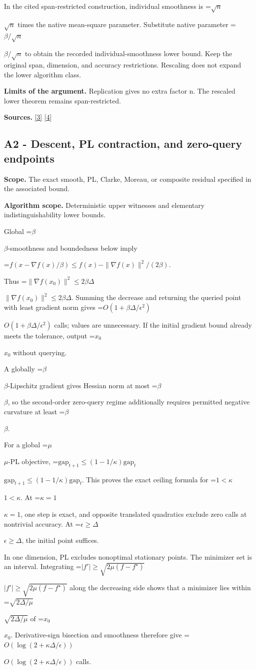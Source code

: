 \documentclass[10pt,a4paper]{article}
\newcommand{\AtlasMath}[1]{\par\begingroup\centering\setbox0=\hbox{$\displaystyle #1$}\ifdim\wd0>1.4\linewidth\typeout{ATLAS WIDE FORMULA: \the\wd0}\fi\ifdim\wd0>\linewidth\resizebox{\linewidth}{!}{\box0}\else\box0\fi\par\endgroup}
\newcommand{\AtlasInlineMath}[1]{\begingroup\setbox0=\hbox{$#1$}\ifdim\wd0>.4\linewidth\endgroup\AtlasMath{#1}\else\endgroup$#1$\fi}
\begin{document}
In the cited span-restricted construction, individual smoothness is \AtlasInlineMath{\sqrt n} times the native mean-square parameter. Substitute native parameter \AtlasInlineMath{\beta/\sqrt n} to obtain the recorded individual-smoothness lower bound. Keep the original span, dimension, and accuracy restrictions. Rescaling does not expand the lower algorithm class.

\textbf{Limits of the argument.} Replication gives no extra factor n. The rescaled lower theorem remains span-restricted.

\textbf{Sources.} \href{https://proceedings.mlr.press/v97/zhou19b/zhou19b.pdf}{[3]} \href{https://arxiv.org/pdf/1405.4980}{[4]}

\subsection{A2 - Descent, PL contraction, and zero-query endpoints}
\textbf{Scope.} The exact smooth, PL, Clarke, Moreau, or composite residual specified in the associated bound.

\textbf{Algorithm scope.} Deterministic upper witnesses and elementary indistinguishability lower bounds.

Global \AtlasInlineMath{\beta}-smoothness and boundedness below imply

\AtlasMath{f(x-\nabla f(x)/\beta)\le f(x)-\|\nabla f(x)\|^2/(2\beta).}

Thus \AtlasInlineMath{\|\nabla f(x_0)\|^2\le2\beta\Delta}. Summing the decrease and returning the queried point with least gradient norm gives \AtlasInlineMath{O(1+\beta\Delta/\epsilon^2)} calls; values are unnecessary. If the initial gradient bound already meets the tolerance, output \AtlasInlineMath{x_0} without querying.

A globally \AtlasInlineMath{\beta}-Lipschitz gradient gives Hessian norm at most \AtlasInlineMath{\beta}, so the second-order zero-query regime additionally requires permitted negative curvature at least \AtlasInlineMath{\beta}.

For a global \AtlasInlineMath{\mu}-PL objective,
\AtlasInlineMath{\mathrm{gap}_{t+1}\le(1-1/\kappa)\mathrm{gap}_t}.
This proves the exact ceiling formula for \AtlasInlineMath{1<\kappa}. At \AtlasInlineMath{\kappa=1}, one step is exact, and opposite translated quadratics exclude zero calls at nontrivial accuracy. At \AtlasInlineMath{\epsilon\ge\Delta}, the initial point suffices.

In one dimension, PL excludes nonoptimal stationary points. The minimizer set is an interval. Integrating
\AtlasInlineMath{|f'|\ge\sqrt{2\mu(f-f^\star)}}
along the decreasing side shows that a minimizer lies within \AtlasInlineMath{\sqrt{2\Delta/\mu}} of \AtlasInlineMath{x_0}. Derivative-sign bisection and smoothness therefore give \AtlasInlineMath{O(\log(2+\kappa\Delta/\epsilon))} calls.
\end{document}
